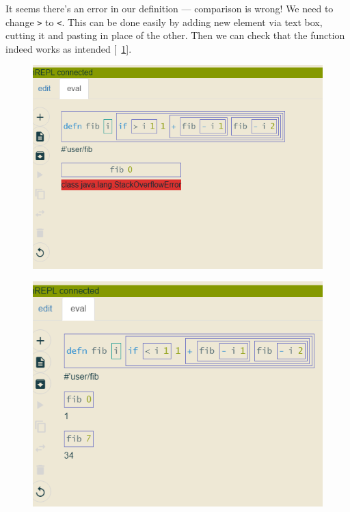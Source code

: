 \documentclass[english,mgr,shortabstract]{iithesis}
\newcommand*{\figref}[1]{[\textbf{\figurename}~\ref{#1}]}
\begin{document}
It seems there's an error in our definition --- comparison is wrong! We need to
change \lstinline{>} to \lstinline{<}. This can be done easily by adding new
element via text box, cutting it and pasting in place of the other. Then we can
check that the function indeed works as intended \figref{fig:j-fib-works}.

\begin{figure}[hbt]
  \centering
  \begin{minipage}{0.48\textwidth}
    \centering
    \includegraphics[scale=0.3]{img/j-fib-err}
\label{fig:j-fib-err}
  \end{minipage}
  \begin{minipage}{0.48\textwidth}
    \centering
    \includegraphics[scale=0.3]{img/j-fib-works}
\label{fig:j-fib-works}
  \end{minipage}
\end{figure}
\end{document}
